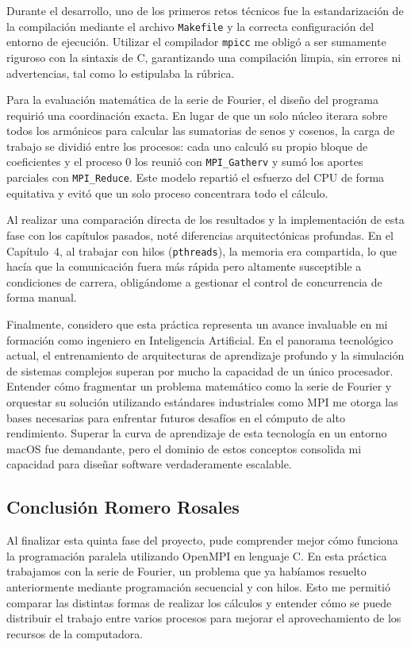 Durante el desarrollo, uno de los primeros retos técnicos fue la estandarización de la compilación mediante el archivo \texttt{Makefile} y la correcta configuración del entorno de ejecución. Utilizar el compilador \texttt{mpicc} me obligó a ser sumamente riguroso con la sintaxis de C, garantizando una compilación limpia, sin errores ni advertencias, tal como lo estipulaba la rúbrica.

Para la evaluación matemática de la serie de Fourier, el diseño del programa requirió una coordinación exacta. En lugar de que un solo núcleo iterara sobre todos los armónicos para calcular las sumatorias de senos y cosenos, la carga de trabajo se dividió entre los procesos: cada uno calculó su propio bloque de coeficientes y el proceso $0$ los reunió con \texttt{MPI\_Gatherv} y sumó los aportes parciales con \texttt{MPI\_Reduce}. Este modelo repartió el esfuerzo del CPU de forma equitativa y evitó que un solo proceso concentrara todo el cálculo.

Al realizar una comparación directa de los resultados y la implementación de esta fase con los capítulos pasados, noté diferencias arquitectónicas profundas. En el Capítulo~4, al trabajar con hilos (\texttt{pthreads}), la memoria era compartida, lo que hacía que la comunicación fuera más rápida pero altamente susceptible a condiciones de carrera, obligándome a gestionar el control de concurrencia de forma manual.

Finalmente, considero que esta práctica representa un avance invaluable en mi formación como ingeniero en Inteligencia Artificial. En el panorama tecnológico actual, el entrenamiento de arquitecturas de aprendizaje profundo y la simulación de sistemas complejos superan por mucho la capacidad de un único procesador. Entender cómo fragmentar un problema matemático como la serie de Fourier y orquestar su solución utilizando estándares industriales como MPI me otorga las bases necesarias para enfrentar futuros desafíos en el cómputo de alto rendimiento. Superar la curva de aprendizaje de esta tecnología en un entorno macOS fue demandante, pero el dominio de estos conceptos consolida mi capacidad para diseñar software verdaderamente escalable.

\clearpage
\subsection*{Conclusión Romero Rosales}
Al finalizar esta quinta fase del proyecto, pude comprender mejor cómo funciona la programación paralela utilizando OpenMPI en lenguaje C. En esta práctica trabajamos con la serie de Fourier, un problema que ya habíamos resuelto anteriormente mediante programación secuencial y con hilos. Esto me permitió comparar las distintas formas de realizar los cálculos y entender cómo se puede distribuir el trabajo entre varios procesos para mejorar el aprovechamiento de los recursos de la computadora.

